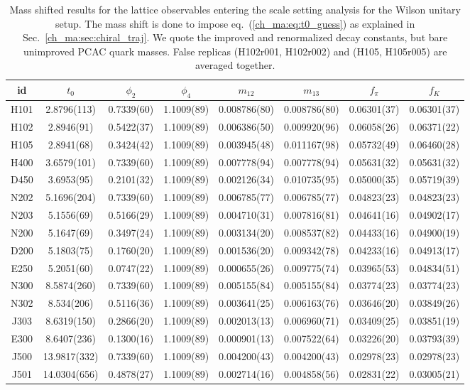\begin{sidewaystable}
\begin{center}
    \begin{tabular}{c c c c c c c c}
id & $t_0$ & $\phi_2$ & $\phi_4$ & $m_{12}$ & $m_{13}$ & $f_{\pi}$ & $f_K$ \\
\toprule
H101 & 2.8796(113) & 0.7339(60) & 1.1009(89) & 0.008786(80) & 0.008786(80) & 0.06301(37) & 0.06301(37) \\
H102 & 2.8946(91) & 0.5422(37) & 1.1009(89) & 0.006386(50) & 0.009920(96) & 0.06058(26) & 0.06371(22) \\
H105 & 2.8941(68) & 0.3424(42) & 1.1009(89) & 0.003945(48) & 0.011167(98) & 0.05732(49) & 0.06460(28) \\
\midrule
H400 & 3.6579(101) & 0.7339(60) & 1.1009(89) & 0.007778(94) & 0.007778(94) & 0.05631(32) & 0.05631(32) \\
D450 & 3.6953(95) & 0.2101(32) & 1.1009(89) & 0.002126(34) & 0.010735(95) & 0.05000(35) & 0.05719(39) \\
\midrule
N202 & 5.1696(204) & 0.7339(60) & 1.1009(89) & 0.006785(77) & 0.006785(77) & 0.04823(23) & 0.04823(23) \\
N203 & 5.1556(69) & 0.5166(29) & 1.1009(89) & 0.004710(31) & 0.007816(81) & 0.04641(16) & 0.04902(17) \\
N200 & 5.1647(69) & 0.3497(24) & 1.1009(89) & 0.003134(20) & 0.008537(82) & 0.04433(16) & 0.04900(19) \\
D200 & 5.1803(75) & 0.1760(20) & 1.1009(89) & 0.001536(20) & 0.009342(78) & 0.04233(16) & 0.04913(17) \\
E250 & 5.2051(60) & 0.0747(22) & 1.1009(89) & 0.000655(26) & 0.009775(74) & 0.03965(53) & 0.04834(51) \\
\midrule
N300 & 8.5874(260) & 0.7339(60) & 1.1009(89) & 0.005155(84) & 0.005155(84) & 0.03774(23) & 0.03774(23) \\
N302 & 8.534(206) & 0.5116(36) & 1.1009(89) & 0.003641(25) & 0.006163(76) & 0.03646(20) & 0.03849(26) \\
J303 & 8.6319(150) & 0.2866(20) & 1.1009(89) & 0.002013(13) & 0.006960(71) & 0.03409(25) & 0.03851(19) \\
E300 & 8.6407(236) & 0.1300(16) & 1.1009(89) & 0.000901(13) & 0.007522(64) & 0.03226(20) & 0.03793(39) \\
\midrule
J500 & 13.9817(332) & 0.7339(60) & 1.1009(89) & 0.004200(43) & 0.004200(43) & 0.02978(23) & 0.02978(23) \\
J501 & 14.0304(656) & 0.4878(27) & 1.1009(89) & 0.002714(16) & 0.004858(56) & 0.02831(22) & 0.03005(21) \\
\bottomrule
    \end{tabular}
    \end{center}
    \caption{Mass shifted results for the lattice observables entering the scale setting analysis for the Wilson unitary setup. The mass shift is done to impose eq.~(\ref{ch_ma:eq:t0_guess}) as explained in Sec.~\ref{ch_ma:sec:chiral_traj}. We quote the improved and renormalized decay constants, but bare unimproved PCAC quark masses. False replicas (H102r001, H102r002) and (H105, H105r005) are averaged together.}
\label{apex_ensembles:tab:obs_w_ms}
\end{sidewaystable}

